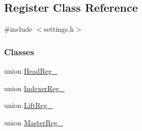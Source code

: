 \hypertarget{classRegister}{}\subsection{Register Class Reference}
\label{classRegister}


{\ttfamily \#include $<$settings.\+h$>$}

\subsubsection*{Classes}
\begin{DoxyCompactItemize}
\item 
union \mbox{\hyperlink{unionRegister_1_1HeadReg__}{Head\+Reg\+\_\+}}
\item 
union \mbox{\hyperlink{unionRegister_1_1IndexerReg__}{Indexer\+Reg\+\_\+}}
\item 
union \mbox{\hyperlink{unionRegister_1_1LiftReg__}{Lift\+Reg\+\_\+}}
\item 
union \mbox{\hyperlink{unionRegister_1_1MasterReg__}{Master\+Reg\+\_\+}}
\end{DoxyCompactItemize}

